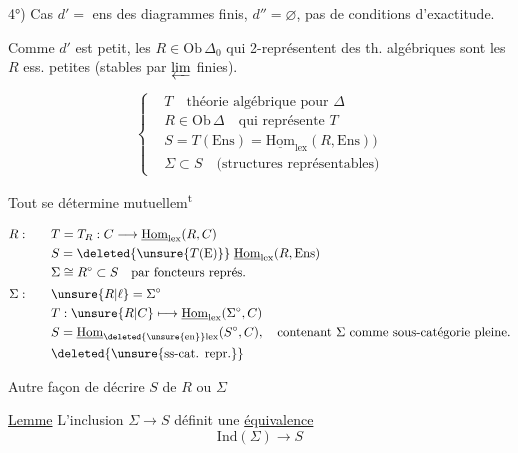 4°) Cas $d'=$ ens des diagrammes finis, $d''=\varnothing$, pas de conditions d'exactitude.

Comme $d'$ est petit, les $R\in\mathrm{Ob}\,\Delta_0$ qui 2-représentent des th. algébriques sont les $R$ ess. petites (stables par $\varprojlim$ finies). 

\[
\left\{\begin{aligned}
&T\quad\text{théorie algébrique pour }\Delta\\
&R\in\mathrm{Ob}\,\Delta\quad\text{qui représente }T\\
&S=T(\mathrm{Ens})=\underline{\mathrm{Hom}}_{\mathrm{lex}}(R,\mathrm{Ens}))\\
&\Sigma\subset S\quad\text{(structures représentables)}
\end{aligned}\right.
\]

Tout se détermine mutuellem\textsuperscript{t}

\[
\begin{aligned}
R:\qquad&T=T_R:C\longrightarrow\underline{\mathrm{Hom}}_{\mathrm{lex}}(R,C)\\
&S=\deleted{\unsure{T(\mathrm{E})}}\;\underline{\mathrm{Hom}}_{\mathrm{lex}}(R,\mathrm{Ens})\\
&\Sigma\cong R^\circ\subset S\quad\text{par foncteurs représ.}\\[2pt]
\Sigma:\qquad&\unsure{R|\ell}=\Sigma^\circ\\
&T:\unsure{R|C}\longmapsto\underline{\mathrm{Hom}}_{\mathrm{lex}}(\Sigma^\circ,C)\\
&S=\underline{\mathrm{Hom}}_{\deleted{\unsure{\mathrm{en}}}\mathrm{lex}}(S^\circ,C),\quad\text{contenant }\Sigma\text{ comme sous-catégorie pleine.}\\
&\deleted{\unsure{\text{ss-cat. repr.}}}
\end{aligned}
\]

 Autre façon de décrire $S$ de $R$ ou $\Sigma$


\uline{Lemme}  L'inclusion $\Sigma\longrightarrow S$ définit une \uline{équivalence}
\[
\mathrm{Ind}(\Sigma)\longrightarrow S
\]

